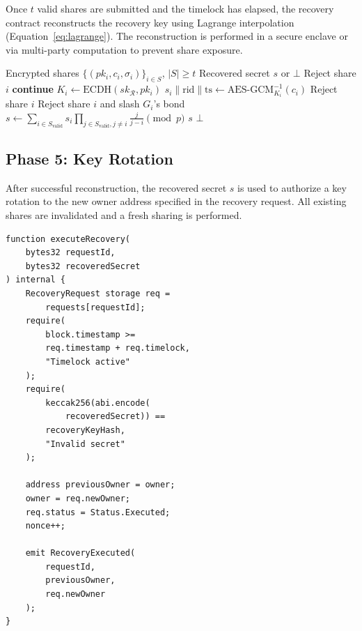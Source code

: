 \documentclass[11pt,a4paper,twocolumn]{article}
\begin{document}
Once $t$ valid shares are submitted and the timelock has elapsed, the recovery contract reconstructs the recovery key using Lagrange interpolation (Equation~\ref{eq:lagrange}). The reconstruction is performed in a secure enclave or via multi-party computation to prevent share exposure.

\begin{algorithm}[H]
\caption{Threshold Reconstruction with Verification}\label{alg:reconstruct}
\begin{algorithmic}[1]
\REQUIRE Encrypted shares $\{(pk_i, c_i, \sigma_i)\}_{i \in S}$, $|S| \geq t$
\ENSURE Recovered secret $s$ or $\bot$
    \STATE Reject share $i$
    \STATE \textbf{continue}
  \ENDIF
  \STATE $K_i \leftarrow \text{ECDH}(sk_{\mathcal{R}}, pk_i)$
  \STATE $s_i \| \text{rid} \| \text{ts} \leftarrow \text{AES-GCM}_{K_i}^{-1}(c_i)$
    \STATE Reject share $i$
  \ENDIF
    \STATE Reject share $i$ and slash $G_i$'s bond
  \ENDIF
\ENDFOR
{}
  \STATE $s \leftarrow \sum_{i \in S_{\text{valid}}} s_i \prod_{j \in S_{\text{valid}}, j \neq i} \frac{j}{j-i} \pmod{p}$
  \RETURN $s$
\ELSE
  \RETURN $\bot$
\ENDIF
\end{algorithmic}
\end{algorithm}

\subsection{Phase 5: Key Rotation}

After successful reconstruction, the recovered secret $s$ is used to authorize a key rotation to the new owner address specified in the recovery request. All existing shares are invalidated and a fresh sharing is performed.

\begin{lstlisting}[style=solidity,caption={Key rotation after recovery},label={lst:rotate}]
function executeRecovery(
    bytes32 requestId,
    bytes32 recoveredSecret
) internal {
    RecoveryRequest storage req =
        requests[requestId];
    require(
        block.timestamp >=
        req.timestamp + req.timelock,
        "Timelock active"
    );
    require(
        keccak256(abi.encode(
            recoveredSecret)) ==
        recoveryKeyHash,
        "Invalid secret"
    );

    address previousOwner = owner;
    owner = req.newOwner;
    req.status = Status.Executed;
    nonce++;

    emit RecoveryExecuted(
        requestId,
        previousOwner,
        req.newOwner
    );
}
\end{lstlisting}
\end{document}
